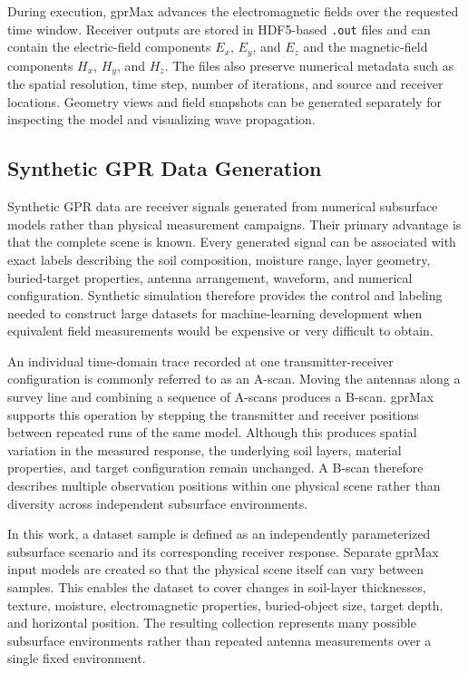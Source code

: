 \documentclass[journal]{IEEEtran}
\begin{document}
During execution, gprMax advances the electromagnetic fields over the requested time window. Receiver outputs are stored in HDF5-based \texttt{.out} files and can contain the electric-field components $E_x$, $E_y$, and $E_z$ and the magnetic-field components $H_x$, $H_y$, and $H_z$. The files also preserve numerical metadata such as the spatial resolution, time step, number of iterations, and source and receiver locations. Geometry views and field snapshots can be generated separately for inspecting the model and visualizing wave propagation.

\subsection{Synthetic GPR Data Generation}

Synthetic GPR data are receiver signals generated from numerical subsurface models rather than physical measurement campaigns. Their primary advantage is that the complete scene is known. Every generated signal can be associated with exact labels describing the soil composition, moisture range, layer geometry, buried-target properties, antenna arrangement, waveform, and numerical configuration. Synthetic simulation therefore provides the control and labeling needed to construct large datasets for machine-learning development when equivalent field measurements would be expensive or very difficult to obtain.

An individual time-domain trace recorded at one transmitter-receiver configuration is commonly referred to as an A-scan. Moving the antennas along a survey line and combining a sequence of A-scans produces a B-scan. gprMax supports this operation by stepping the transmitter and receiver positions between repeated runs of the same model. Although this produces spatial variation in the measured response, the underlying soil layers, material properties, and target configuration remain unchanged. A B-scan therefore describes multiple observation positions within one physical scene rather than diversity across independent subsurface environments.

In this work, a dataset sample is defined as an independently parameterized subsurface scenario and its corresponding receiver response. Separate gprMax input models are created so that the physical scene itself can vary between samples. This enables the dataset to cover changes in soil-layer thicknesses, texture, moisture, electromagnetic properties, buried-object size, target depth, and horizontal position. The resulting collection represents many possible subsurface environments rather than repeated antenna measurements over a single fixed environment.
\end{document}
